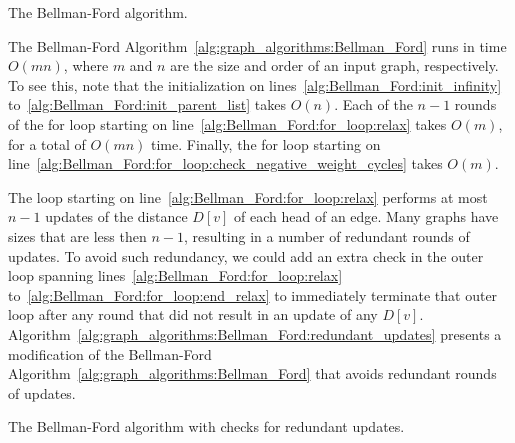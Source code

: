 \begin{algorithm}[!htbp]

\caption{The Bellman-Ford algorithm.}
\label{alg:graph_algorithms:Bellman_Ford}
\end{algorithm}

The Bellman-Ford Algorithm~\ref{alg:graph_algorithms:Bellman_Ford}
runs in time $O(mn)$, where $m$ and $n$ are the size and order of an
input graph, respectively. To see this, note that the initialization
on lines~\ref{alg:Bellman_Ford:init_infinity}
to~\ref{alg:Bellman_Ford:init_parent_list} takes $O(n)$. Each of the
$n - 1$ rounds of the for loop starting on
line~\ref{alg:Bellman_Ford:for_loop:relax} takes $O(m)$, for a total
of $O(mn)$ time. Finally, the for loop starting on
line~\ref{alg:Bellman_Ford:for_loop:check_negative_weight_cycles}
takes $O(m)$.

The loop starting on line~\ref{alg:Bellman_Ford:for_loop:relax}
performs at most $n - 1$ updates of the distance
$D[v]$ of each head of an edge. Many graphs have sizes that are less
then $n - 1$, resulting in a number of redundant rounds of updates. To
avoid such redundancy, we could add an extra check in the outer loop
spanning lines~\ref{alg:Bellman_Ford:for_loop:relax}
to~\ref{alg:Bellman_Ford:for_loop:end_relax} to immediately terminate
that outer loop after any round that did not result in an update of
any $D[v]$.
Algorithm~\ref{alg:graph_algorithms:Bellman_Ford:redundant_updates}
presents a modification of the Bellman-Ford
Algorithm~\ref{alg:graph_algorithms:Bellman_Ford} that avoids
redundant rounds of updates.

\begin{algorithm}[!htbp]

\caption{The Bellman-Ford algorithm with checks for redundant updates.}
\label{alg:graph_algorithms:Bellman_Ford:redundant_updates}
\end{algorithm}



